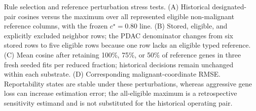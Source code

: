 Rule selection and reference perturbation stress tests. (A) Historical designated-pair cosines versus the maximum over all represented eligible non-malignant reference columns, with the frozen \(c^\star=0.80\) line. (B) Stored, eligible, and explicitly excluded neighbor rows; the PDAC denominator changes from six stored rows to five eligible rows because one row lacks an eligible typed reference. (C) Mean cosine after retaining 100\%, 75\%, or 50\% of reference genes in three fresh seeded fits per reduced fraction; historical decisions remain unchanged within each substrate. (D) Corresponding malignant-coordinate RMSE. Reportability states are stable under these perturbations, whereas aggressive gene loss can increase estimation error; the all-eligible maximum is a retrospective sensitivity estimand and is not substituted for the historical operating pair.
